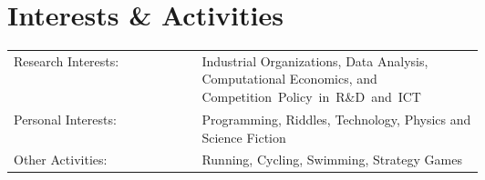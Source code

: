 \documentclass[a4paper,9pt]{article}
\begin{document}
\section{Interests \& Activities}

\begin{tabular}{lp{0.6\linewidth}}
	Research Interests: & Industrial Organizations, Data Analysis, Computational Economics, and \mbox{Competition Policy in R\&D and ICT}\\
	Personal Interests: & Programming, Riddles, Technology, Physics and Science Fiction\\
	Other Activities:   & Running, Cycling, Swimming, Strategy Games
\end{tabular}


%
%
\end{document}
